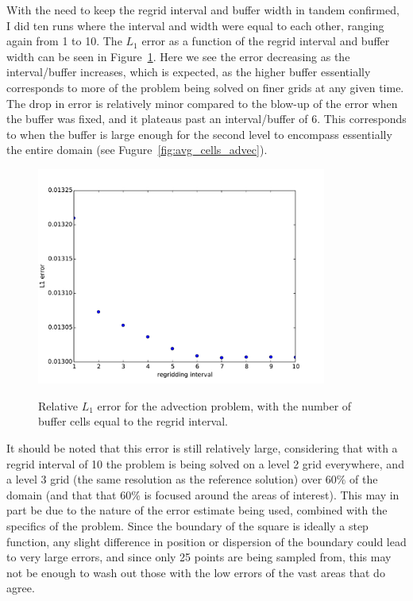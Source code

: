 \documentclass[11pt]{article}
\begin{document}
With the need to keep the regrid interval and buffer width in tandem confirmed,
I did ten runs where the interval and width were equal to each other,
ranging again from 1 to 10. The $L_1$ error as a function of the regrid interval
and buffer width can be seen in Figure~\ref{fig:err_advec}. Here we see the
error decreasing as the interval/buffer increases, which is expected, as the
higher buffer essentially corresponds to more of the problem being solved on
finer grids at any given time. The drop in error is relatively minor compared
to the blow-up of the error when the buffer was fixed, and it plateaus past 
an interval/buffer of 6. This corresponds to when the buffer is large enough
for the second level to encompass essentially the entire domain (see 
Fugure~\ref{fig:avg_cells_advec}).

\begin{figure}[!htb]
\centering
\caption{Relative $L_1$ error for the advection problem, with the number of
buffer cells equal to the regrid interval.}
\includegraphics[width=0.85\textwidth]{myclaw/l1_err_advec}
\label{fig:err_advec}
\end{figure}

It should be noted that this error is still relatively large, considering
that with a regrid interval of 10 the problem is being solved on a level 2
grid everywhere, and a level 3 grid (the same resolution as the reference 
solution) over 60\% of the domain (and that that 60\% is focused around
the areas of interest). This may in part be due to the nature of the error
estimate being used, combined with the specifics of the problem. Since the
boundary of the square is ideally a step function, any slight difference
in position or dispersion of the boundary could lead to very large errors,
and since only 25 points are being sampled from, this may not be enough to 
wash out those with the low errors of the vast areas that do agree.
\end{document}
